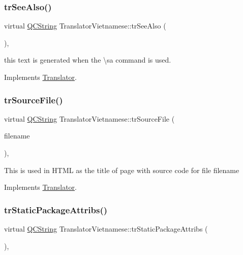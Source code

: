 \subsubsection{\texorpdfstring{trSeeAlso()}{trSeeAlso()}}
{\footnotesize\ttfamily virtual \mbox{\hyperlink{class_q_c_string}{Q\+C\+String}} Translator\+Vietnamese\+::tr\+See\+Also (\begin{DoxyParamCaption}{ }\end{DoxyParamCaption})\hspace{0.3cm}{\ttfamily [inline]}, {\ttfamily [virtual]}}

this text is generated when the \textbackslash{}sa command is used. 

Implements \mbox{\hyperlink{class_translator}{Translator}}.

\mbox{\label{class_translator_vietnamese_a27928cfb9aa5bad7aa306cc0a2296d56}} 
\subsubsection{\texorpdfstring{trSourceFile()}{trSourceFile()}}
{\footnotesize\ttfamily virtual \mbox{\hyperlink{class_q_c_string}{Q\+C\+String}} Translator\+Vietnamese\+::tr\+Source\+File (\begin{DoxyParamCaption}\item[{\mbox{\hyperlink{class_q_c_string}{Q\+C\+String}} \&}]{filename }\end{DoxyParamCaption})\hspace{0.3cm}{\ttfamily [inline]}, {\ttfamily [virtual]}}

This is used in H\+T\+ML as the title of page with source code for file filename 

Implements \mbox{\hyperlink{class_translator}{Translator}}.

\mbox{\label{class_translator_vietnamese_a8c196e52cf85888a374c4cf1592cc0bb}} 
\subsubsection{\texorpdfstring{trStaticPackageAttribs()}{trStaticPackageAttribs()}}
{\footnotesize\ttfamily virtual \mbox{\hyperlink{class_q_c_string}{Q\+C\+String}} Translator\+Vietnamese\+::tr\+Static\+Package\+Attribs (\begin{DoxyParamCaption}{ }\end{DoxyParamCaption})\hspace{0.3cm}{\ttfamily [inline]}, {\ttfamily [virtual]}}

